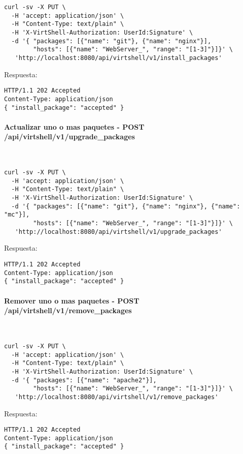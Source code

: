 \begin{lstlisting}[style=json]
curl -sv -X PUT \
  -H 'accept: application/json' \
  -H "Content-Type: text/plain" \
  -H 'X-VirtShell-Authorization: UserId:Signature' \
  -d '{ "packages": [{"name": "git"}, {"name": "nginx"}],
        "hosts": [{"name": "WebServer_", "range": "[1-3]"}]}' \
   'http://localhost:8080/api/virtshell/v1/install_packages'
\end{lstlisting}

\vspace{1cm}
Respuesta:
\vspace{1cm}

\begin{lstlisting}[style=json]
HTTP/1.1 202 Accepted
Content-Type: application/json
{ "install_package": "accepted" }
\end{lstlisting}

\paragraph{Actualizar uno o mas paquetes - POST /api/virtshell/v1/upgrade\_packages} ~\\

\begin{lstlisting}[style=json]
curl -sv -X PUT \
  -H 'accept: application/json' \
  -H "Content-Type: text/plain" \
  -H 'X-VirtShell-Authorization: UserId:Signature' \
  -d '{ "packages": [{"name": "git"}, {"name": "nginx"}, {"name": "mc"}],
        "hosts": [{"name": "WebServer_", "range": "[1-3]"}]}' \
   'http://localhost:8080/api/virtshell/v1/upgrade_packages'
\end{lstlisting}

\vspace{1cm}
Respuesta:
\vspace{1cm}

\begin{lstlisting}[style=json]
HTTP/1.1 202 Accepted
Content-Type: application/json
{ "install_package": "accepted" }
\end{lstlisting}

\paragraph{Remover uno o mas paquetes - POST /api/virtshell/v1/remove\_packages} ~\\

\begin{lstlisting}[style=json]
curl -sv -X PUT \
  -H 'accept: application/json' \
  -H "Content-Type: text/plain" \
  -H 'X-VirtShell-Authorization: UserId:Signature' \
  -d '{ "packages": [{"name": "apache2"}],
        "hosts": [{"name": "WebServer_", "range": "[1-3]"}]}' \
   'http://localhost:8080/api/virtshell/v1/remove_packages'
\end{lstlisting}

\vspace{1cm}
Respuesta:
\vspace{1cm}

\begin{lstlisting}[style=json]
HTTP/1.1 202 Accepted
Content-Type: application/json
{ "install_package": "accepted" }
\end{lstlisting}